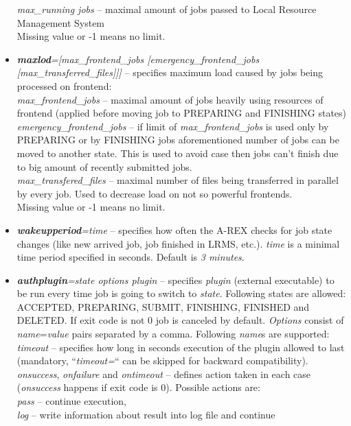 \documentclass{article}                            %
\begin{document}
\begin{itemize}
\textit{max\_running jobs} -- maximal amount of jobs passed to Local
Resource Management System\\
Missing value or -1 means no limit.
\item \textbf{\textit{maxlod}}\textit{={[}max\_frontend\_jobs {[}emergency\_frontend\_jobs
{[}max\_transferred\_files]]]} -- specifies maximum load caused by
jobs being processed on frontend:\\
\textit{max\_frontend\_jobs} -- maximal amount of jobs heavily using
resources of frontend (applied before moving job to PREPARING and
FINISHING states)\textit{}\\
\textit{emergency\_frontend\_jobs} -- if limit of \textit{max\_frontend\_jobs}
is used only by PREPARING or by FINISHING jobs aforementioned number
of jobs can be moved to another state. This is used to avoid case
then jobs can't finish due to big amount of recently submitted jobs.\textit{}\\
\textit{max\_transfered\_files} -- maximal number of files being transferred
in parallel by every job. Used to decrease load on not so powerful
frontends.\\
Missing value or -1 means no limit.
\item \textbf{\textit{wakeupperiod}}\textit{=time} -- specifies how often
the A-REX checks for job state changes (like new arrived job, job
finished in LRMS, etc.). \textit{time} is a minimal time period specified
in seconds. Default is \emph{3 minutes}.
\item \textbf{\textit{authplugin}}\textit{=state options plugin} -- specifies
\emph{plugin} (external executable) to be run every time job is going
to switch to \emph{state}. Following states are allowed: ACCEPTED,
PREPARING, SUBMIT, FINISHING, FINISHED and DELETED. If exit code is
not 0 job is canceled by default. \textit{Options} consist of \textit{name}=\textit{value}
pairs separated by a comma. Following \textit{name}s are supported:\\
\textit{timeout} -- specifies how long in seconds execution of the
plugin allowed to last (mandatory, {}``\textit{timeout=}{}`` can
be skipped for backward compatibility).\\
\textit{onsuccess}, \textit{onfailure} and \textit{ontimeout} -- defines
action taken in each case (\textit{onsuccess} happens if exit code
is 0). Possible actions are:\\
\textit{pass} -- continue execution,\\
\textit{log} -- write information about result into log file and continue

\end{itemize}
\end{document}
